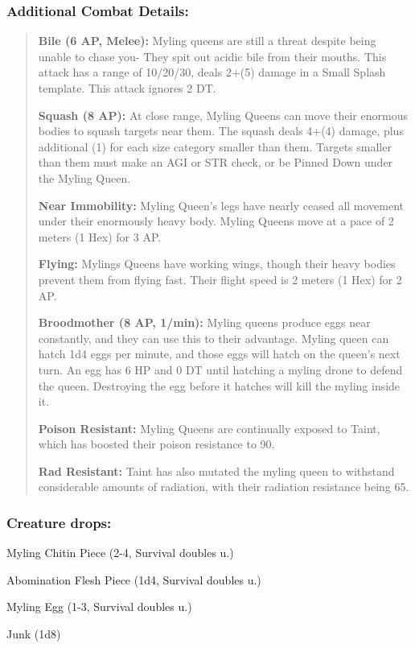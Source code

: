 \documentclass[11pt,a4paper,twocolumn]{book}
\begin{document}
	\subsubsection*{Additional Combat Details:}
	\begin{verse}
		\textbf{Bile (6 AP, Melee):} Myling queens are still a threat despite being unable to chase you- They spit out acidic bile from their mouths. This attack has a range of 10/20/30, deals 2+(5) damage in a Small Splash template. This attack ignores 2 DT.
		
		\textbf{Squash (8 AP):} At close range, Myling Queens can move their enormous bodies to squash targets near them. The squash deals 4+(4) damage, plus additional (1) for each size category smaller than them. Targets smaller than them must make an AGI or STR check, or be Pinned Down under the Myling Queen. 
		
		\textbf{Near Immobility:} Myling Queen's legs have nearly ceased all movement under their enormously heavy body. Myling Queens move at a pace of 2 meters (1 Hex) for 3 AP.
		
		\textbf{Flying:} Mylings Queens have working wings, though their heavy bodies prevent them from flying fast. Their flight speed is 2 meters (1 Hex) for 2 AP.
		
		\textbf{Broodmother (8 AP, 1/min):} Myling queens produce eggs near constantly, and they can use this to their advantage. Myling queen can hatch 1d4 eggs per minute, and those eggs will hatch on the queen's next turn. An egg has 6 HP and 0 DT until hatching a myling drone to defend the queen. Destroying the egg before it hatches will kill the myling inside it.
		
		\textbf{Poison Resistant:} Myling Queens are continually exposed to Taint, which has boosted their poison resistance to 90.
		
		\textbf{Rad Resistant:} Taint has also mutated the myling queen to withstand considerable amounts of radiation, with their radiation resistance being 65.
	\end{verse}
	
	\subsubsection*{Creature drops:}
	\begin{compactitem}
		\item Myling Chitin Piece (2-4, Survival doubles u.)
		\item Abomination Flesh Piece (1d4, Survival doubles u.)
		\item Myling Egg (1-3, Survival doubles u.)
		\item Junk (1d8)
	\end{compactitem}
	
\end{document}
